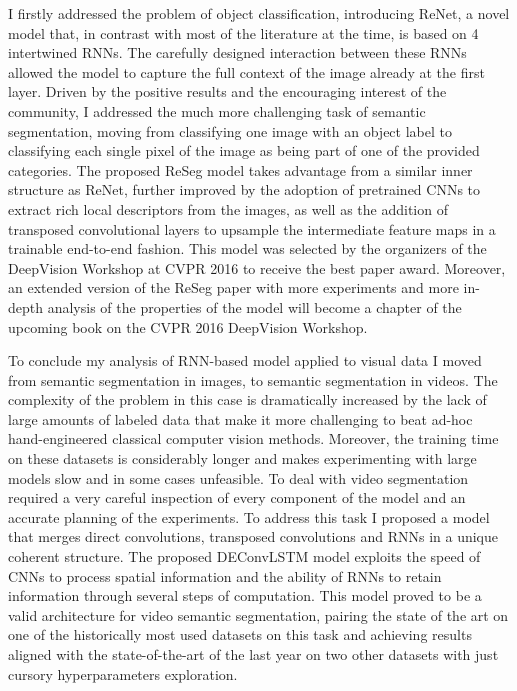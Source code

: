 I firstly addressed the problem of object classification, introducing ReNet, a
novel model that, in contrast with most of the literature at the time, is
based on 4 intertwined RNNs. The carefully designed interaction between these
RNNs allowed the model to capture the full context of the image already at the
first layer. Driven by the positive results and the encouraging interest of
the community, I addressed the much more challenging task of semantic
segmentation, moving from classifying one image with an object label to
classifying each single pixel of the image as being part of one of the provided
categories. The proposed ReSeg model takes advantage from a similar inner
structure as ReNet, further improved by the adoption of pretrained CNNs to
extract rich local descriptors from the images, as well as the addition of
transposed convolutional layers to upsample the intermediate feature maps in a
trainable end-to-end fashion. This model was selected by the organizers of the
DeepVision Workshop at CVPR 2016 to receive the best paper award. Moreover, an
extended version of the ReSeg paper with more experiments and more in-depth
analysis of the properties of the model will become a chapter of the upcoming
book on the CVPR 2016 DeepVision Workshop.

To conclude my analysis of RNN-based model applied to visual data I moved from
semantic segmentation in images, to semantic segmentation in videos. The
complexity of the problem in this case is dramatically increased by the lack of
large amounts of labeled data that make it more challenging to beat ad-hoc
hand-engineered classical computer vision methods. Moreover, the training time
on these datasets is considerably longer and makes experimenting with large
models slow and in some cases unfeasible. To deal with video segmentation
required a very careful inspection of every component of the model and an
accurate planning of the experiments. To address this task I proposed a model
that merges direct convolutions, transposed convolutions and RNNs in a unique
coherent structure. The proposed DEConvLSTM model exploits the speed of CNNs to
process spatial information and the ability of RNNs to retain information
through several steps of computation. This model proved to be a valid
architecture for video semantic segmentation, pairing the state of the art on
one of the historically most used datasets on this task and achieving results
aligned with the state-of-the-art of the last year on two other datasets with
just cursory hyperparameters exploration.

